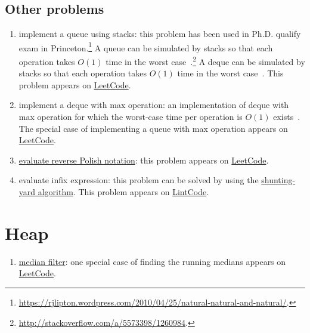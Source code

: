 \subsection{Other problems}
\begin{enumerate}
\item implement a queue using stacks: this problem has been used in Ph.D. qualify exam in Princeton.\footnote{\url{https://rjlipton.wordpress.com/2010/04/25/natural-natural-and-natural/}.} A queue can be simulated by stacks so that each operation takes $O(1)$ time in the worst case~\cite{Hood1981}.\footnote{\url{http://stackoverflow.com/a/5573398/1260984}.} A deque can be simulated by stacks so that each operation takes $O(1)$ time in the worst case~\cite{Chuang1993}. This problem appears on \href{https://leetcode.com/problems/implement-queue-using-stacks/}{LeetCode}.
\item implement a deque with max operation: an implementation of deque with max operation for which the worst-case time per operation is $O(1)$ exists~\cite{Gajewska1986}. The special case of implementing a queue with max operation appears on \href{https://leetcode.com/problems/sliding-window-maximum/}{LeetCode}.
\item \href{https://en.wikipedia.org/wiki/Reverse_Polish_notation#Postfix_algorithm}{evaluate reverse Polish notation}: this problem appears on \href{https://leetcode.com/problems/evaluate-reverse-polish-notation/}{LeetCode}.
\item evaluate infix expression: this problem can be solved by using the \href{https://en.wikipedia.org/wiki/Shunting-yard_algorithm}{shunting-yard algorithm}. This problem appears on \href{http://www.lintcode.com/en/problem/expression-evaluation/}{LintCode}.
\end{enumerate}

\section{Heap}
\begin{enumerate}
\item \href{https://en.wikipedia.org/wiki/Median_filter}{median filter}: one special case of finding the running medians appears on \href{https://leetcode.com/problems/find-median-from-data-stream/}{LeetCode}.
\end{enumerate}

